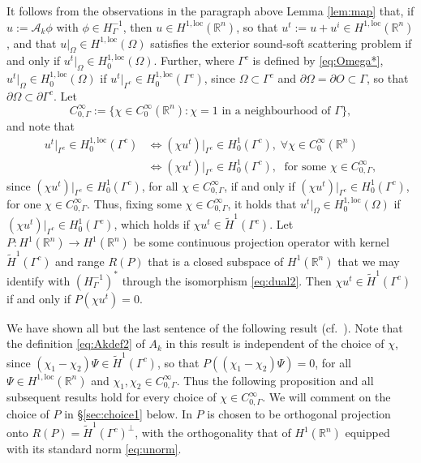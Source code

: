 \documentclass{birkjour}
\theoremstyle{definition}
\theoremstyle{remark}
\numberwithin{equation}{section}
\newcommand{\R}{\mathbb{R}}
\newcommand{\Hol}{H^{1,\mathrm{loc}}}
\newcommand{\cA}{\mathcal{A}}
\begin{document}
It follows from the observations in the paragraph above Lemma \ref{lem:map} that, if $u:=\cA_k \phi$ with $\phi\in H^{-1}_\Gamma$, then $u\in \Hol(\R^n)$, so that $u^t:= u+u^i\in \Hol(\R^n)$, and that $u|_\Omega\in \Hol(\Omega)$ satisfies the exterior sound-soft scattering problem if and only if $u^t|_\Omega\in \Hol_0(\Omega)$.  Further, where $\Gamma^c$ is defined by \eqref{eq:Omega*}, $u^t|_\Omega\in \Hol_0(\Omega)$ if  $u^t|_{\Gamma^c}\in \Hol_0(\Gamma^c)$, since $\Omega\subset \Gamma^c$ and $\partial \Omega = \partial O\subset \Gamma$, so that $\partial \Omega\subset \partial \Gamma^c$.  Let
$$
C^\infty_{0,\Gamma} := \{\chi\in C_0^\infty(\R^n): \chi=1 \mbox{ in a neighbourhood of }\Gamma\},
$$
and note that
\begin{align*}
u^t|_{\Gamma^c}\in \Hol_0(\Gamma^c) &\Leftrightarrow (\chi u^t)|_{\Gamma^c}\in H_0^1(\Gamma^c), \; \forall \chi\in C_0^\infty(\R^n)\\
& \Leftrightarrow  (\chi u^t)|_{\Gamma^c}\in H_0^1(\Gamma^c), \; \mbox{ for some } \chi\in C^\infty_{0,\Gamma},
\end{align*}
since  $(\chi u^t)|_{\Gamma^c}\in H_0^1(\Gamma^c)$, for all $\chi\in C^\infty_{0,\Gamma}$, if and only if  $(\chi u^t)|_{\Gamma^c}\in H_0^1(\Gamma^c)$, for one $\chi\in C^\infty_{0,\Gamma}$.
Thus, fixing  some $\chi\in C^\infty_{0,\Gamma}$, it holds that $u^t|_\Omega\in \Hol_0(\Omega)$ if  $(\chi u^t)|_{\Gamma^c}\in H_0^1(\Gamma^c)$, which holds if $\chi u^t\in \widetilde H^1(\Gamma^c)$.
Let $P:H^1(\R^n)\to H^1(\R^n)$ be some continuous projection operator with kernel $\widetilde H^1(\Gamma^c)$ %
and range $R(P)$ that is a closed subspace of $H^1(\R^n)$ that we may identify with $(H_\Gamma^{-1})^*$ through the isomorphism \eqref{eq:dual2}. Then  $\chi u^t\in \widetilde H^1(\Gamma^c)$ if and only if $P(\chi u^t) = 0$.

 We have shown all but the last sentence of the following result (cf.~\cite[Thm.~3.4, Rem.~3.8]{caetano2025integral}). Note that the definition \eqref{eq:Akdef2} of $A_k$ in this result  is independent of the choice of $\chi$, since $(\chi_1-\chi_2)\Psi \in \widetilde H^1(\Gamma^c)$, so that $P((\chi_1-\chi_2)\Psi)=0$, for all $\Psi\in \Hol(\R^n)$ and $\chi_1,\chi_2 \in C^\infty_{0,\Gamma}$. Thus the following proposition and all subsequent results hold for every  choice of $\chi \in C^\infty_{0,\Gamma}$. We will comment on the choice of $P$ in \S\ref{sec:choice1} below. In \cite{caetano2025integral} $P$ is chosen to be orthogonal projection onto  $R(P)=\widetilde H^1(\Gamma^c)^\perp$, with the orthogonality that of $H^1(\R^n)$ equipped with its standard norm \eqref{eq:unorm}.
\end{document}
